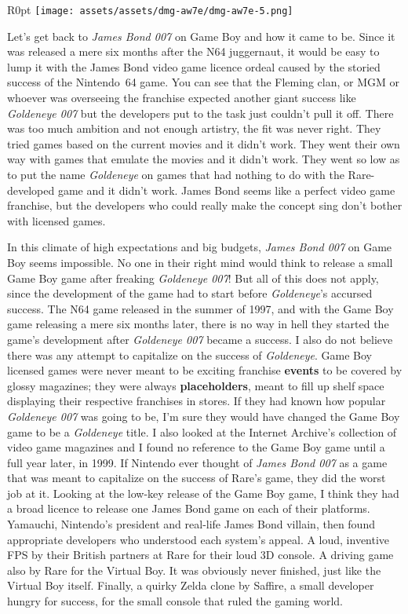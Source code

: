 \documentclass{book}
\begin{document}
\begin{wrapfigure}{R}{0pt} \texttt{[image: assets/assets/dmg-aw7e/dmg-aw7e-5.png]}\end{wrapfigure}
Let’s get back to \emph{James Bond 007} on Game Boy and how it came to be. Since it was released a mere six months after the N64 juggernaut, it would be easy to lump it with the James Bond video game licence ordeal caused by the storied success of the Nintendo~64 game. You can see that the Fleming clan, or MGM or whoever was overseeing the franchise expected another giant success like \emph{Goldeneye 007} but the developers put to the task just couldn’t pull it off. There was too much ambition and not enough artistry, the fit was never right. They tried games based on the current movies and it didn’t work. They went their own way with games that emulate the movies and it didn’t work. They went so low as to put the name \emph{Goldeneye} on games that had nothing to do with the Rare-developed game and it didn’t work. James Bond seems like a perfect video game franchise, but the developers who could really make the concept sing don’t bother with licensed games.

In this climate of high expectations and big budgets, \emph{James Bond 007} on Game Boy seems impossible. No one in their right mind would think to release a small Game Boy game after freaking \emph{Goldeneye 007}! But all of this does not apply, since the development of the game had to start before \emph{Goldeneye}’s accursed success. The N64 game released in the summer of 1997, and with the Game Boy game releasing a mere six months later, there is no way in hell they started the game’s development after \emph{Goldeneye 007} became a success. I also do not believe there was any attempt to capitalize on the success of \emph{Goldeneye}. Game Boy licensed games were never meant to be exciting franchise \textbf{events} to be covered by glossy magazines; they were always \textbf{placeholders}, meant to fill up shelf space displaying their respective franchises in stores. If they had known how popular \emph{Goldeneye 007} was going to be, I’m sure they would have changed the Game Boy game to be a \emph{Goldeneye} title. I also looked at the Internet Archive’s collection of video game magazines and I found no reference to the Game Boy game until a full year later, in 1999. If Nintendo ever thought of \emph{James Bond 007} as a game that was meant to capitalize on the success of Rare’s game, they did the worst job at it. Looking at the low-key release of the Game Boy game, I think they had a broad licence to release one James Bond game on each of their platforms. Yamauchi, Nintendo’s president and real-life James Bond villain, then found appropriate developers who understood each system’s appeal. A loud, inventive FPS by their British partners at Rare for their loud 3D console. A driving game also by Rare for the Virtual Boy. It was obviously never finished, just like the Virtual Boy itself. Finally, a quirky Zelda clone by Saffire, a small developer hungry for success, for the small console that ruled the gaming world.
\end{document}
